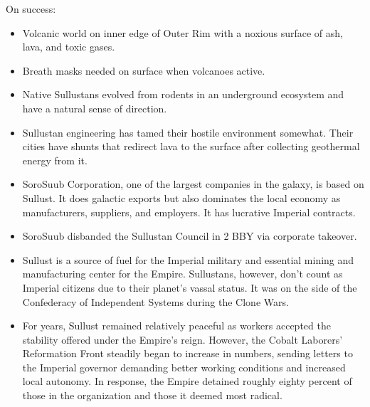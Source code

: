 \documentclass{book}
\begin{document}
\begin{multicols*}{2}
On success:
\begin{itemize}
    \item Volcanic world on inner edge of Outer Rim with a noxious surface of ash, lava, and toxic gases.  
    \item Breath masks needed on surface when volcanoes active.
    \item Native Sullustans evolved from rodents in an underground ecosystem and have a natural sense of direction.
    \item \advantage  Sullustan engineering has tamed their hostile environment somewhat. Their cities have shunts that redirect lava to the surface after collecting geothermal energy from it.
   \item \advantage SoroSuub Corporation, one of the largest companies in the galaxy, is based on Sullust. It does galactic exports but also dominates the local economy as manufacturers, suppliers, and employers.  It has lucrative Imperial contracts.%
	\item \advantage SoroSuub disbanded the Sullustan Council in 2 BBY via corporate takeover.
    \item \advantage Sullust is a source of fuel for the Imperial military and essential mining and manufacturing center for the Empire.  Sullustans, however, don't count as Imperial citizens due to their planet's vassal status.  It was on the side of the Confederacy of Independent Systems during the Clone Wars.
    \item \advantage For years, Sullust remained relatively peaceful as workers accepted the stability offered under the Empire's reign. However, the Cobalt Laborers' Reformation Front steadily began to increase in numbers, sending letters to the Imperial governor demanding better working conditions and increased local autonomy. In response, the Empire detained roughly eighty percent of those in the organization and those it deemed most radical.

\end{itemize}
\end{multicols*}
\end{document}
